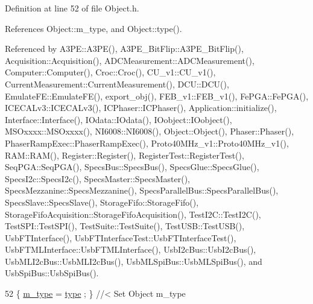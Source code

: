 Definition at line 52 of file Object.\+h.



References Object\+::m\+\_\+type, and Object\+::type().



Referenced by A3\+P\+E\+::\+A3\+P\+E(), A3\+P\+E\+\_\+\+Bit\+Flip\+::\+A3\+P\+E\+\_\+\+Bit\+Flip(), Acquisition\+::\+Acquisition(), A\+D\+C\+Measurement\+::\+A\+D\+C\+Measurement(), Computer\+::\+Computer(), Croc\+::\+Croc(), C\+U\+\_\+v1\+::\+C\+U\+\_\+v1(), Current\+Measurement\+::\+Current\+Measurement(), D\+C\+U\+::\+D\+C\+U(), Emulate\+F\+E\+::\+Emulate\+F\+E(), export\+\_\+obj(), F\+E\+B\+\_\+v1\+::\+F\+E\+B\+\_\+v1(), Fe\+P\+G\+A\+::\+Fe\+P\+G\+A(), I\+C\+E\+C\+A\+Lv3\+::\+I\+C\+E\+C\+A\+Lv3(), I\+C\+Phaser\+::\+I\+C\+Phaser(), Application\+::initialize(), Interface\+::\+Interface(), I\+Odata\+::\+I\+Odata(), I\+Oobject\+::\+I\+Oobject(), M\+S\+Oxxxx\+::\+M\+S\+Oxxxx(), N\+I6008\+::\+N\+I6008(), Object\+::\+Object(), Phaser\+::\+Phaser(), Phaser\+Ramp\+Exec\+::\+Phaser\+Ramp\+Exec(), Proto40\+M\+Hz\+\_\+v1\+::\+Proto40\+M\+Hz\+\_\+v1(), R\+A\+M\+::\+R\+A\+M(), Register\+::\+Register(), Register\+Test\+::\+Register\+Test(), Seq\+P\+G\+A\+::\+Seq\+P\+G\+A(), Specs\+Bus\+::\+Specs\+Bus(), Specs\+Glue\+::\+Specs\+Glue(), Specs\+I2c\+::\+Specs\+I2c(), Specs\+Master\+::\+Specs\+Master(), Specs\+Mezzanine\+::\+Specs\+Mezzanine(), Specs\+Parallel\+Bus\+::\+Specs\+Parallel\+Bus(), Specs\+Slave\+::\+Specs\+Slave(), Storage\+Fifo\+::\+Storage\+Fifo(), Storage\+Fifo\+Acquisition\+::\+Storage\+Fifo\+Acquisition(), Test\+I2\+C\+::\+Test\+I2\+C(), Test\+S\+P\+I\+::\+Test\+S\+P\+I(), Test\+Suite\+::\+Test\+Suite(), Test\+U\+S\+B\+::\+Test\+U\+S\+B(), Usb\+F\+T\+Interface(), Usb\+F\+T\+Interface\+Test\+::\+Usb\+F\+T\+Interface\+Test(), Usb\+F\+T\+M\+L\+Interface\+::\+Usb\+F\+T\+M\+L\+Interface(), Usb\+I2c\+Bus\+::\+Usb\+I2c\+Bus(), Usb\+M\+L\+I2c\+Bus\+::\+Usb\+M\+L\+I2c\+Bus(), Usb\+M\+L\+Spi\+Bus\+::\+Usb\+M\+L\+Spi\+Bus(), and Usb\+Spi\+Bus\+::\+Usb\+Spi\+Bus().


\begin{DoxyCode}
52 \{ \hyperlink{classObject_a457a600fe8c00eb1034374f75110a78c}{m\_type}  = \hyperlink{classObject_a84f99f70f144a83e1582d1d0f84e4e62}{type}  ; \} \textcolor{comment}{//< Set Object m\_type}
\end{DoxyCode}
\mbox{\label{classUsbFTInterface_a6718c98c2b6d5924b6722e81f93f25f0}} 
